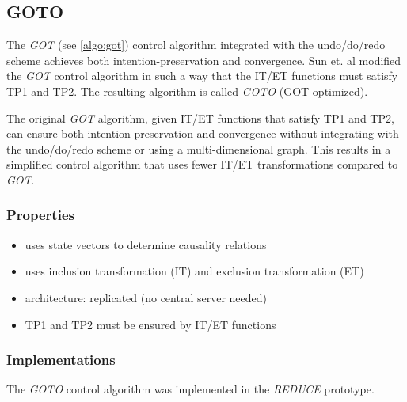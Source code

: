 \subsection{GOTO}
\label{algo:goto}

The \emph{GOT} (see \ref{algo:got}) control algorithm integrated with the undo/do/redo scheme achieves both intention-preservation and convergence. Sun et. al \cite{sun98b} modified the \emph{GOT} control algorithm in such a way that the IT/ET functions must satisfy TP1 and TP2. The resulting algorithm is called \emph{GOTO} (GOT optimized).

The original \emph{GOT} algorithm, given IT/ET functions that satisfy TP1 and TP2, can ensure both intention preservation and convergence without integrating with the undo/do/redo scheme or using a multi-dimensional graph. This results in a simplified control algorithm that uses fewer IT/ET transformations compared to \emph{GOT}.


\subsubsection{Properties}
\begin{itemize}
 \item uses state vectors to determine causality relations
 \item uses inclusion transformation (IT) and exclusion transformation (ET)
 \item architecture: replicated (no central server needed)
 \item TP1 and TP2 must be ensured by IT/ET functions
\end{itemize}


\subsubsection{Implementations}
The \emph{GOTO} control algorithm was implemented in the \emph{REDUCE} prototype. 
